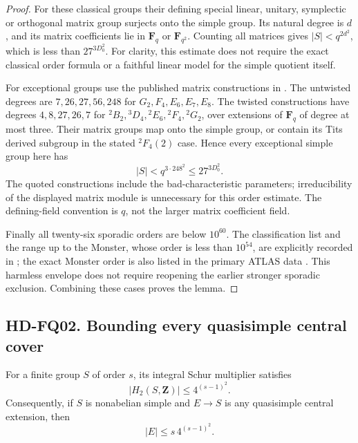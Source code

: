 \begin{proof}
For these classical groups their defining special linear, unitary,
symplectic or orthogonal matrix group surjects onto the simple group.
Its natural degree is $d$, and its matrix coefficients lie in
$\mathbf F_q$ or $\mathbf F_{q^2}$.  Counting all matrices gives
$|S|<q^{2d^2}$, which is less than $27^{3D_0^2}$.
For clarity, this estimate does not require the exact classical order
formula or a faithful linear model for the simple quotient itself.

For exceptional groups use the published matrix constructions in
\cite[\S3, author pp.~4--12; \S4, pp.~12--17]{FQ:HRT2001}.
The untwisted degrees are $7,26,27,56,248$ for
$G_2,F_4,E_6,E_7,E_8$.  The twisted constructions have degrees
$4,8,27,26,7$ for
${}^2B_2,{}^3D_4,{}^2E_6,{}^2F_4,{}^2G_2$, over extensions of
$\mathbf F_q$ of degree at most three.  Their matrix groups map
onto the simple group, or contain its Tits derived subgroup in the
stated ${}^2F_4(2)$ case.  Hence every exceptional simple group here has
\[
                        |S|<q^{3\cdot248^2}
                                 \le27^{3D_0^2}.
                                                               \tag{FQ.5}
\]
The quoted constructions include the bad-characteristic parameters;
irreducibility of the displayed matrix module is unnecessary for
this order estimate.  The defining-field convention is $q$, not the
larger matrix coefficient field.

Finally all twenty-six sporadic orders are below $10^{60}$.
The classification list and the range up to the Monster, whose order
is less than $10^{54}$, are explicitly recorded in
\cite[Lecture~1, p.~1]{FQ:Wilson2008}; the exact Monster order is also
listed in the primary ATLAS data \cite{FQ:AtlasMonster}.
This harmless envelope does not require reopening the earlier stronger
sporadic exclusion.  Combining these cases proves the lemma.
\end{proof}

\subsection*{HD-FQ02. Bounding every quasisimple central cover}

\begin{lemma}[HD-FQ02]
For a finite group $S$ of order $s$, its integral Schur multiplier satisfies
\[
                  |H_2(S,\mathbf Z)|\le4^{(s-1)^2}.
                                                               \tag{FQ.6}
\]
Consequently, if $S$ is nonabelian simple and $E\to S$ is any
quasisimple central extension, then
\[
                         |E|\le s\,4^{(s-1)^2}.
                                                               \tag{FQ.7}
\]
\end{lemma}

